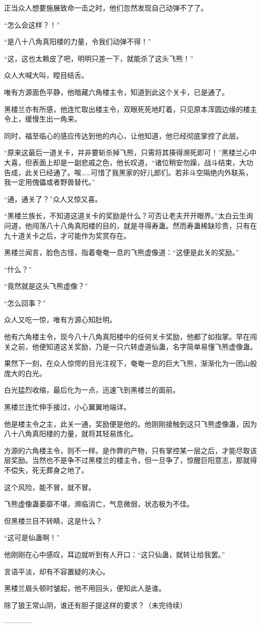 \begin{this_body}
正当众人想要施展致命一击之时，他们忽然发现自己动弹不了了。

“怎么会这样？！”

“是八十八角真阳楼的力量，令我们动弹不得！”

“这，这也太赖皮了吧，明明只差一下，就能杀了这头飞熊！”

众人大喊大叫，瞠目结舌。

唯有方源面色平静，他暗藏六角楼主令，知道到此这个关卡，已是通了。

黑楼兰亦有所感，他连忙取出楼主令，双眼死死地盯着，只见原本浑圆边缘的楼主令上，缓慢生出一角来。

同时，福至临心的感应传达到他的内心，让他知道，他已经彻底掌控了此层。

“原来这最后一道关卡，并非要斩杀掉飞熊，只需将其揍得濒死即可！”黑楼兰心中大喜，但表面上却是一副悲戚之色，他长叹道，“诸位稍安勿躁，战斗结束，大功告成，此关已经通了。唉……可惜了我黑家的好儿郎们。若非斗空隔绝内外联系，我一定用傀儡或者野兽替代。”

“通，通关了？”众人又惊又喜。

“黑楼兰族长，不知道这道关卡的奖励是什么？可否让老夫开开眼界。”太白云生询问道，他闯荡八十八角真阳楼的目的，就是寻得寿蛊。然而寿蛊稀缺珍贵，只有在九十道关卡之后，才可能作为奖赏存在。

黑楼兰闻言，脸色古怪，指着奄奄一息的飞熊虚像道：“这便是此关的奖励。”

“什么？”

“竟然就是这头飞熊虚像？”

“怎么回事？”

众人又吃一惊，唯有方源心知肚明。

他有六角楼主令，现今八十八角真阳楼中的任何关卡奖励，他都了如指掌。早在闯关之前，他便知道这关奖励，乃是一只六转虚道仙蛊，名字简单易懂飞熊虚像蛊。

果然下一刻，在众人惊愕的目光注视下，奄奄一息的巨大飞熊，渐渐化为一团山般庞大的白光。

白光猛烈收缩，最后化为一点，迅速飞到黑楼兰的面前。

黑楼兰连忙伸手接过，小心翼翼地端详。

他是楼主令之主，此关一通，奖励便是他的。他刚刚接触到这只飞熊虚像蛊，因为八十八角真阳楼的力量，就将其轻易炼化。

方源的六角楼主令，则不一样。是作弊的产物，只有掌控某一层之后，才能尽取该层奖励。当然也不是争不过黑楼兰的楼主令，但一旦争了，惊醒巨阳意志，那就得不偿失，死无葬身之地了。

这个风险，能不冒，就不冒。

飞熊虚像蛊萎靡不堪，濒临消亡，气息微弱，状态极为不佳。

但黑楼兰目不转睛，这是什么？

“这可是仙蛊啊！”

他刚刚在心中感叹，耳边就听到有人开口：“这只仙蛊，就转让给我罢。”

言语平淡，却有不容置疑的决心。

黑楼兰眉头顿时皱起，他不用回头，便知此人是谁。

除了狼王常山阴，谁还有胆子提这样的要求？（未完待续）

------------

\end{this_body}

